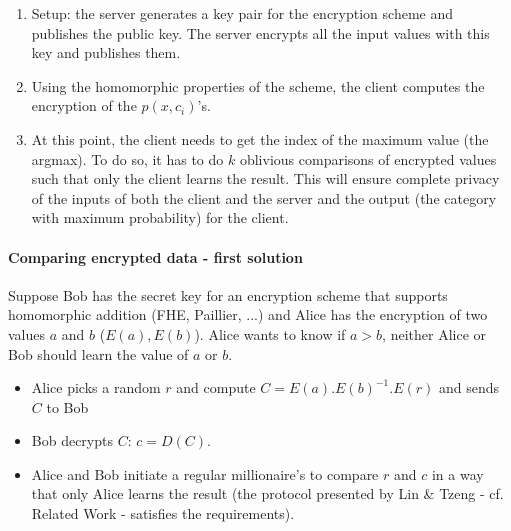 \documentclass[11pt]{article}
\begin{document}
	\begin{enumerate}
		\item Setup: the server generates a key pair for the encryption scheme and publishes the public key. The server encrypts all the input values with this key and publishes them.
		
		\item Using the homomorphic properties of the scheme, the client computes the encryption of the $p(x,c_i)$'s.
		
		\item At this point, the client needs to get the index of the maximum value (the argmax). 
		To do so, it has to do $k$ oblivious comparisons of encrypted values such that only the client learns the result. This will ensure complete privacy of the inputs of both the client and the server and the output (the category with maximum probability) for the client.     
		
	\end{enumerate}
	
	\paragraph{Comparing encrypted data - first solution}
	Suppose Bob has the secret key for an encryption scheme that supports homomorphic addition (FHE, Paillier, ...) and Alice has the encryption of two values $a$ and $b$ ($E(a), E(b)$). Alice wants to know if $a > b$, neither Alice or Bob should learn the value of $a$ or $b$.
	\begin{itemize}
		\item Alice picks a random $r$ and compute $C = E(a).E(b)^{-1}.E(r)$ and sends $C$ to Bob
		
		\item Bob decrypts $C$: $c = D(C)$.
		
		\item Alice and Bob initiate a regular millionaire's to compare $r$ and $c$ in a way that only Alice learns the result (the protocol presented by Lin \& Tzeng - cf. Related Work - satisfies the requirements). 
	\end{itemize} 
	      	
\end{document}
